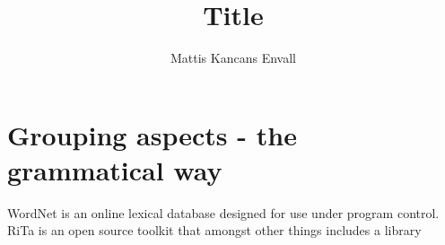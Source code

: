 \documentclass{article}
\title{Title}
\author{Mattis Kancans Envall}
\begin{document}
\maketitle

\section{Grouping aspects - the grammatical way}
WordNet\citep{miller1995wordnet} is an online lexical database designed for use under program control. RiTa\citep{howe2009rita} is an open source toolkit that amongst other things includes a library 




\newpage


\end{document}
